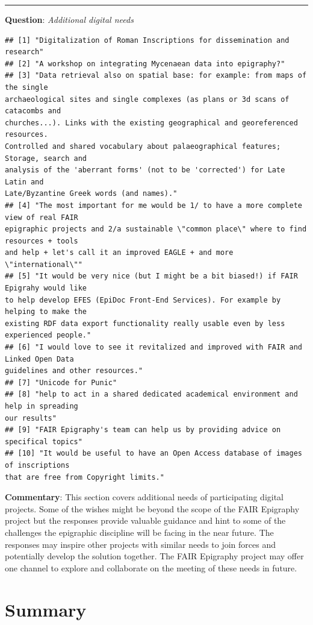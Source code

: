 \documentclass[
  10pt,
]{article}
\begin{document}
\begin{center}\rule{0.5\linewidth}{0.5pt}\end{center}

\textbf{Question}: \emph{Additional digital needs}

\begin{verbatim}
## [1] "Digitalization of Roman Inscriptions for dissemination and research"
## [2] "A workshop on integrating Mycenaean data into epigraphy?"
## [3] "Data retrieval also on spatial base: for example: from maps of the single
archaeological sites and single complexes (as plans or 3d scans of catacombs and
churches...). Links with the existing geographical and georeferenced resources.
Controlled and shared vocabulary about palaeographical features; Storage, search and
analysis of the 'aberrant forms' (not to be 'corrected') for Late Latin and
Late/Byzantine Greek words (and names)."
## [4] "The most important for me would be 1/ to have a more complete view of real FAIR
epigraphic projects and 2/a sustainable \"common place\" where to find resources + tools
and help + let's call it an improved EAGLE + and more \"international\""
## [5] "It would be very nice (but I might be a bit biased!) if FAIR Epigrahy would like
to help develop EFES (EpiDoc Front-End Services). For example by helping to make the
existing RDF data export functionality really usable even by less experienced people."
## [6] "I would love to see it revitalized and improved with FAIR and Linked Open Data
guidelines and other resources."
## [7] "Unicode for Punic"
## [8] "help to act in a shared dedicated academical environment and help in spreading
our results"
## [9] "FAIR Epigraphy's team can help us by providing advice on specifical topics"
## [10] "It would be useful to have an Open Access database of images of inscriptions
that are free from Copyright limits."
\end{verbatim}

\textbf{Commentary}: This section covers additional needs of
participating digital projects. Some of the wishes might be beyond the
scope of the FAIR Epigraphy project but the responses provide valuable
guidance and hint to some of the challenges the epigraphic discipline
will be facing in the near future. The responses may inspire other
projects with similar needs to join forces and potentially develop the
solution together. The FAIR Epigraphy project may offer one channel to
explore and collaborate on the meeting of these needs in future.

\hypertarget{summary}{%
\section{Summary}\label{summary}}
\end{document}
